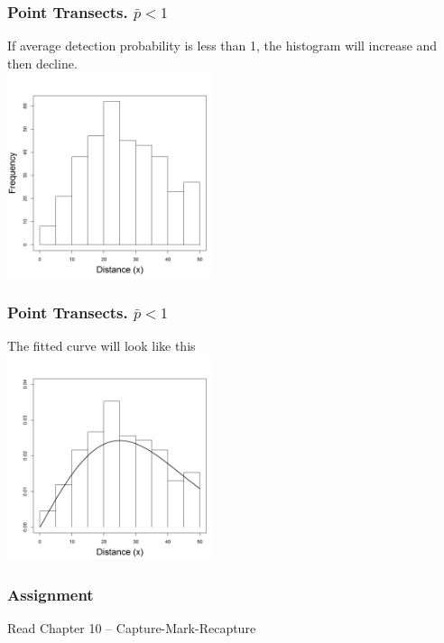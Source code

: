 \documentclass[color=usenames,dvipsnames]{beamer}\usepackage[]{graphicx}\usepackage[]{color}
\begin{document}
\begin{frame}
  \frametitle{Point Transects. $\bar{p} < 1$}
\begin{center}
  If average detection probability is less than 1, the histogram will
  increase and then decline. \\
  \includegraphics[width=6cm]{figs/detfun6}
\end{center}
\end{frame}




\begin{frame}
  \frametitle{Point Transects. $\bar{p} < 1$}
\begin{center}
  The fitted curve will look like this \\
  \includegraphics[width=6cm]{figs/detfun7}
\end{center}
\end{frame}











\begin{frame}
  \frametitle{Assignment}
  \Large
  \begin{center}
    Read Chapter 10 -- Capture-Mark-Recapture
  \end{center}
\end{frame}
\end{document}
